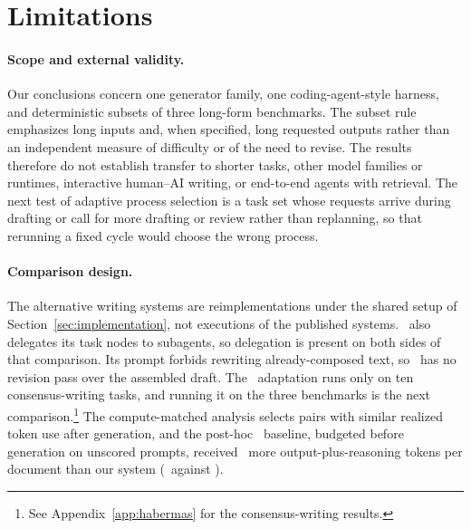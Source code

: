 \clearpage
\section*{Limitations}
\label{sec:limitations}

\paragraph{Scope and external validity.}
Our conclusions concern one generator family, one coding-agent-style harness, and deterministic subsets of three long-form benchmarks.
The subset rule emphasizes long inputs and, when specified, long requested outputs rather than an independent measure of difficulty or of the need to revise.
The results therefore do not establish transfer to shorter tasks, other model families or runtimes, interactive human--AI writing, or end-to-end agents with retrieval.
The next test of adaptive process selection is a task set whose requests arrive during drafting or call for more drafting or review rather than replanning, so that rerunning a fixed cycle would choose the wrong process.

\paragraph{Comparison design.}
The alternative writing systems are reimplementations under the shared setup of Section~\ref{sec:implementation}, not executions of the published systems.
\condTaskPlanning\ also delegates its task nodes to subagents, so delegation is present on both sides of that comparison.
Its prompt forbids rewriting already-composed text, so \condTaskPlanning\ has no revision pass over the assembled draft.
The \condExploratoryTwo\ adaptation runs only on ten consensus-writing tasks, and running it on the three benchmarks is the next comparison.\footnote{See Appendix~\ref{app:habermas} for the consensus-writing results.}
The compute-matched analysis selects pairs with similar realized token use after generation, and the post-hoc \condSelfRefine\ baseline, budgeted before generation on unscored prompts, received \SelfRefineTokenExcess\ more output-plus-reasoning tokens per document than our system (\SelfRefineOutputTokens\ against \SelfRefineAfourOutputTokens).


